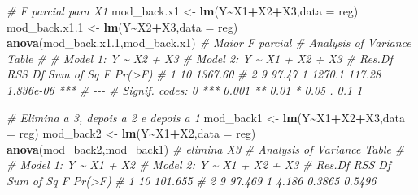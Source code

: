 \documentclass[
]{book}
\newenvironment{Shaded}{\begin{snugshade}}{\end{snugshade}}
\newcommand{\CommentTok}[1]{\textcolor[rgb]{0.56,0.35,0.01}{\textit{#1}}}
\newcommand{\DataTypeTok}[1]{\textcolor[rgb]{0.13,0.29,0.53}{#1}}
\newcommand{\FloatTok}[1]{\textcolor[rgb]{0.00,0.00,0.81}{#1}}
\newcommand{\KeywordTok}[1]{\textcolor[rgb]{0.13,0.29,0.53}{\textbf{#1}}}
\newcommand{\NormalTok}[1]{#1}
\newcommand{\OperatorTok}[1]{\textcolor[rgb]{0.81,0.36,0.00}{\textbf{#1}}}
\newcommand{\StringTok}[1]{\textcolor[rgb]{0.31,0.60,0.02}{#1}}
\numberwithin{equation}{section}
\begin{document}
\begin{Shaded}
\begin{Highlighting}[]
\CommentTok{\# F parcial para X1}
\NormalTok{mod\_back.x1 \textless{}{-}}\StringTok{ }\KeywordTok{lm}\NormalTok{(Y}\OperatorTok{\textasciitilde{}}\NormalTok{X1}\OperatorTok{+}\NormalTok{X2}\OperatorTok{+}\NormalTok{X3,}\DataTypeTok{data =}\NormalTok{ reg)}
\NormalTok{mod\_back.x1}\FloatTok{.1}\NormalTok{ \textless{}{-}}\StringTok{ }\KeywordTok{lm}\NormalTok{(Y}\OperatorTok{\textasciitilde{}}\NormalTok{X2}\OperatorTok{+}\NormalTok{X3,}\DataTypeTok{data =}\NormalTok{ reg)}
\KeywordTok{anova}\NormalTok{(mod\_back.x1}\FloatTok{.1}\NormalTok{,mod\_back.x1) }\CommentTok{\# Maior F parcial }
\CommentTok{\# Analysis of Variance Table}
\CommentTok{\# }
\CommentTok{\# Model 1: Y \textasciitilde{} X2 + X3}
\CommentTok{\# Model 2: Y \textasciitilde{} X1 + X2 + X3}
\CommentTok{\#   Res.Df     RSS Df Sum of Sq      F    Pr(\textgreater{}F)    }
\CommentTok{\# 1     10 1367.60                                  }
\CommentTok{\# 2      9   97.47  1    1270.1 117.28 1.836e{-}06 ***}
\CommentTok{\# {-}{-}{-}}
\CommentTok{\# Signif. codes:  0 \textquotesingle{}***\textquotesingle{} 0.001 \textquotesingle{}**\textquotesingle{} 0.01 \textquotesingle{}*\textquotesingle{} 0.05 \textquotesingle{}.\textquotesingle{} 0.1 \textquotesingle{} \textquotesingle{} 1}

\CommentTok{\# Elimina a 3, depois a 2 e depois a 1}
\NormalTok{mod\_back1 \textless{}{-}}\StringTok{ }\KeywordTok{lm}\NormalTok{(Y}\OperatorTok{\textasciitilde{}}\NormalTok{X1}\OperatorTok{+}\NormalTok{X2}\OperatorTok{+}\NormalTok{X3,}\DataTypeTok{data =}\NormalTok{ reg)}
\NormalTok{mod\_back2 \textless{}{-}}\StringTok{ }\KeywordTok{lm}\NormalTok{(Y}\OperatorTok{\textasciitilde{}}\NormalTok{X1}\OperatorTok{+}\NormalTok{X2,}\DataTypeTok{data =}\NormalTok{ reg)}
\KeywordTok{anova}\NormalTok{(mod\_back2,mod\_back1) }\CommentTok{\# elimina X3}
\CommentTok{\# Analysis of Variance Table}
\CommentTok{\# }
\CommentTok{\# Model 1: Y \textasciitilde{} X1 + X2}
\CommentTok{\# Model 2: Y \textasciitilde{} X1 + X2 + X3}
\CommentTok{\#   Res.Df     RSS Df Sum of Sq      F Pr(\textgreater{}F)}
\CommentTok{\# 1     10 101.655                           }
\CommentTok{\# 2      9  97.469  1     4.186 0.3865 0.5496}


\end{Highlighting}
\end{Shaded}
\end{document}
